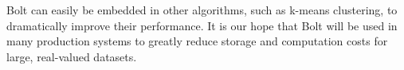 \documentclass[sigconf]{acmart}  %
\begin{document}
Bolt can easily be embedded in other algorithms, such as k-means clustering, to dramatically improve their performance.  It is our hope that Bolt will be used in many production systems to greatly reduce storage and computation costs for large, real-valued datasets.





\end{document}
